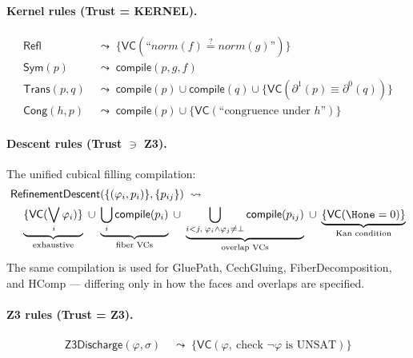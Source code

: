 \paragraph{Kernel rules (Trust = KERNEL).}

\begin{align}
  \mathsf{Refl} &\;\leadsto\;
    \{\mathsf{VC}(\text{``}\mathit{norm}(f) \stackrel{?}{=}
    \mathit{norm}(g)\text{''})\}
    \tag{no Z3; syntactic comparison after normalization}
    \\[4pt]
  \mathsf{Sym}(p) &\;\leadsto\;
    \mathsf{compile}(p, g, f)
    \tag{swap LHS/RHS, compile inner}
    \\[4pt]
  \mathsf{Trans}(p, q) &\;\leadsto\;
    \mathsf{compile}(p) \cup \mathsf{compile}(q) \cup
    \{\mathsf{VC}(\partial^1(p) \equiv \partial^0(q))\}
    \tag{seam check}
    \\[4pt]
  \mathsf{Cong}(h, p) &\;\leadsto\;
    \mathsf{compile}(p) \cup
    \{\mathsf{VC}(\text{``congruence under } h\text{''})\}
\end{align}

\paragraph{Descent rules (Trust $\ni$ Z3).}

The unified cubical filling compilation:
\begin{align}
  &\mathsf{RefinementDescent}(\{(\varphi_i, p_i)\}, \{p_{ij}\})
  \;\leadsto\;
  \notag \\
  &\quad \underbrace{\{\mathsf{VC}(\bigvee_i \varphi_i)\}}_\text{exhaustive}
  \;\cup\;
  \underbrace{\bigcup_i \mathsf{compile}(p_i)}_\text{fiber VCs}
  \;\cup\;
  \underbrace{\bigcup_{i < j,\; \varphi_i \wedge \varphi_j \neq \bot}
    \mathsf{compile}(p_{ij})}_\text{overlap VCs}
  \;\cup\;
  \underbrace{\{\mathsf{VC}(\Hone = 0)\}}_\text{Kan condition}
\end{align}
The same compilation is used for \textsf{GluePath}, \textsf{CechGluing},
\textsf{FiberDecomposition}, and \textsf{HComp} — differing only in how
the faces and overlaps are specified.

\paragraph{Z3 rules (Trust = Z3).}

\begin{align}
  \mathsf{Z3Discharge}(\varphi, \sigma) &\;\leadsto\;
    \{\mathsf{VC}(\varphi,\ \text{check } \neg\varphi \text{ is UNSAT})\}
\end{align}


